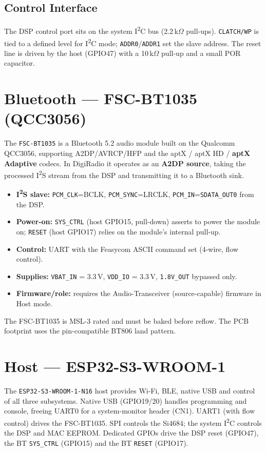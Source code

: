 \documentclass[11pt,a4paper]{report}
\newcommand{\ic}[1]{\texttt{#1}}
\begin{document}
\subsection{Control Interface}
The DSP control port sits on the system I\textsuperscript{2}C bus (2.2\,k$\Omega$
pull-ups). \ic{CLATCH/WP} is tied to a defined level for I\textsuperscript{2}C mode;
\ic{ADDR0}/\ic{ADDR1} set the slave address. The reset line is driven by the host
(GPIO47) with a 10\,k$\Omega$ pull-up and a small POR capacitor.

\section{Bluetooth --- FSC-BT1035 (QCC3056)}
The \ic{FSC-BT1035} is a Bluetooth 5.2 audio module built on the Qualcomm QCC3056,
supporting A2DP/AVRCP/HFP and the aptX / aptX HD / \textbf{aptX Adaptive} codecs. In
DigiRadio it operates as an \textbf{A2DP source}, taking the processed I\textsuperscript{2}S
stream from the DSP and transmitting it to a Bluetooth sink.

\begin{itemize}[leftmargin=1.4em,itemsep=2pt]
  \item \textbf{I\textsuperscript{2}S slave:} \ic{PCM\_CLK}=BCLK, \ic{PCM\_SYNC}=LRCLK,
        \ic{PCM\_IN}=\ic{SDATA\_OUT0} from the DSP.
  \item \textbf{Power-on:} \ic{SYS\_CTRL} (host GPIO15, pull-down) asserts to power the
        module on; \ic{RESET} (host GPIO17) relies on the module's internal pull-up.
  \item \textbf{Control:} UART with the Feasycom ASCII command set (4-wire, flow control).
  \item \textbf{Supplies:} \ic{VBAT\_IN} = 3.3\,V, \ic{VDD\_IO} = 3.3\,V,
        \ic{1.8V\_OUT} bypassed only.
  \item \textbf{Firmware/role:} requires the Audio-Transceiver (source-capable)
        firmware in Host mode.
\end{itemize}

\begin{notebox}
The FSC-BT1035 is MSL-3 rated and must be baked before reflow. The PCB footprint
uses the pin-compatible BT806 land pattern.
\end{notebox}

\section{Host --- ESP32-S3-WROOM-1}
The \ic{ESP32-S3-WROOM-1-N16} host provides Wi-Fi, BLE, native USB and control of all
three subsystems. Native USB (GPIO19/20) handles programming and console, freeing
UART0 for a system-monitor header (CN1). UART1 (with flow control) drives the
FSC-BT1035. SPI controls the Si4684; the system I\textsuperscript{2}C controls the DSP
and MAC EEPROM. Dedicated GPIOs drive the DSP reset (GPIO47), the BT \ic{SYS\_CTRL}
(GPIO15) and the BT \ic{RESET} (GPIO17).
\end{document}
